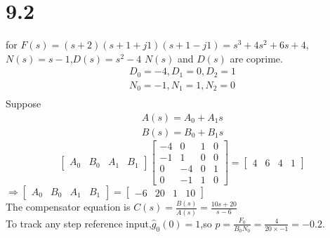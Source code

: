 \documentclass{article}
\begin{document}
\section*{9.2}
for $F(s)=(s+2)(s+1+j1)(s+1-j1)=s^3+4s^2+6s+4$,$N(s)=s-1$,$D(s)=s^2-4$
$N(s)$ and $D(s)$ are coprime.
\[
\begin{split}
D_0=-4,D_1=0,D_2=1\\
N_0=-1,N_1=1,N_2=0\\
\end{split}    
\]
Suppose 
\[
    \begin{split}
    A(s)=A_0+A_1s \\
    B(s)=B_0+B_1s
    \end{split}
\]
\[
   \left[ 
       \begin{array}{cccc}
        A_0 & B_0 & A_1 & B_1
    \end{array}
   \right]
   \left[ 
       \begin{array}{cccc}
        -4 & 0 & 1 & 0\\
        -1 & 1 & 0 & 0\\
        0 & -4 & 0 & 1\\
        0 & -1 & 1 & 0
    \end{array}
   \right]=\left[ 
       \begin{array}{cccc}
        4 & 6 & 4 & 1
    \end{array}
   \right]
\]
$\Rightarrow \left[ 
    \begin{array}{cccc}
    A_0 & B_0 & A_1 & B_1
    \end{array}
\right]=\left[
    \begin{array}{cccc} 
    -6 & 20 &1 & 10
    \end{array}
\right]
$\\
The compensator equation is $C(s)=\frac{B(s)}{A(s)}=\frac{10s+20}{s-6}$\\
To track any step reference input,$\hat{g}_0(0)=1$,so $p=\frac{F_0}{B_0N_0}=\frac{4}{20 \times -1 }=-0.2$.
\end{document}
